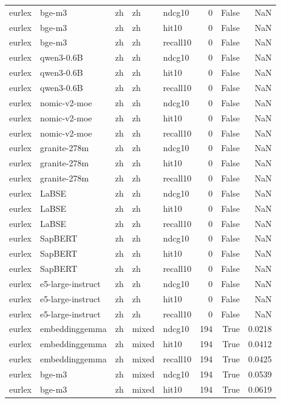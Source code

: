 \begin{tabular}{lllllrrr}
eurlex & bge-m3 & zh & zh & ndcg10 & 0 & False & NaN \\
eurlex & bge-m3 & zh & zh & hit10 & 0 & False & NaN \\
eurlex & bge-m3 & zh & zh & recall10 & 0 & False & NaN \\
eurlex & qwen3-0.6B & zh & zh & ndcg10 & 0 & False & NaN \\
eurlex & qwen3-0.6B & zh & zh & hit10 & 0 & False & NaN \\
eurlex & qwen3-0.6B & zh & zh & recall10 & 0 & False & NaN \\
eurlex & nomic-v2-moe & zh & zh & ndcg10 & 0 & False & NaN \\
eurlex & nomic-v2-moe & zh & zh & hit10 & 0 & False & NaN \\
eurlex & nomic-v2-moe & zh & zh & recall10 & 0 & False & NaN \\
eurlex & granite-278m & zh & zh & ndcg10 & 0 & False & NaN \\
eurlex & granite-278m & zh & zh & hit10 & 0 & False & NaN \\
eurlex & granite-278m & zh & zh & recall10 & 0 & False & NaN \\
eurlex & LaBSE & zh & zh & ndcg10 & 0 & False & NaN \\
eurlex & LaBSE & zh & zh & hit10 & 0 & False & NaN \\
eurlex & LaBSE & zh & zh & recall10 & 0 & False & NaN \\
eurlex & SapBERT & zh & zh & ndcg10 & 0 & False & NaN \\
eurlex & SapBERT & zh & zh & hit10 & 0 & False & NaN \\
eurlex & SapBERT & zh & zh & recall10 & 0 & False & NaN \\
eurlex & e5-large-instruct & zh & zh & ndcg10 & 0 & False & NaN \\
eurlex & e5-large-instruct & zh & zh & hit10 & 0 & False & NaN \\
eurlex & e5-large-instruct & zh & zh & recall10 & 0 & False & NaN \\
eurlex & embeddinggemma & zh & mixed & ndcg10 & 194 & True & 0.0218 \\
eurlex & embeddinggemma & zh & mixed & hit10 & 194 & True & 0.0412 \\
eurlex & embeddinggemma & zh & mixed & recall10 & 194 & True & 0.0425 \\
eurlex & bge-m3 & zh & mixed & ndcg10 & 194 & True & 0.0539 \\
eurlex & bge-m3 & zh & mixed & hit10 & 194 & True & 0.0619 \\

\end{tabular}
